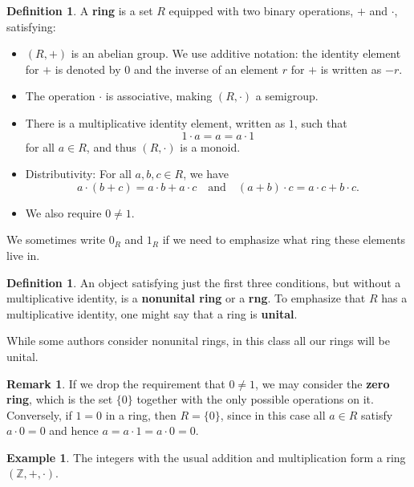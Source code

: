 \documentclass[12pt]{report}
\numberwithin{equation}{section}
\numberwithin{theorem}{chapter}
\theoremstyle{definition}
\newtheorem{definition}[theorem]{Definition}
\newtheorem{example}[theorem]{Example}
\newtheorem*{basic properties}{Basic Properties}
\newtheorem*{Important Remark}{Important Remark}
\newtheorem{remark}[theorem]{Remark}
\newcommand{\df}[1]{{\bf #1}\index{#1}}
\begin{document}
\begin{definition} 
A \df{ring} is a set $R$ equipped with two binary operations, $+$ and $\cdot$, satisfying:
\begin{itemize}[itemsep=-0.2em]
\item $(R,+)$ is an abelian group. We use additive notation: the identity element for $+$ is denoted by $0$ and the inverse of an element $r$ for $+$ is written as $-r$. 
\item The operation $\cdot$ is associative, making $(R,\cdot)$ a semigroup.
\item There is a multiplicative identity element, written as $1$, such that 
$$1 \cdot a = a = a \cdot 1$$ 
for all $a \in R$, and thus $(R, \cdot)$ is a monoid.

\item Distributivity: For all $a,b,c \in R$, we have 
$$a \cdot (b + c) = a \cdot b + a \cdot c \quad \text{and} \quad (a + b) \cdot c = a \cdot c + b \cdot c.$$
\item We also require $0 \neq 1$.
\end{itemize}
\end{definition}

We sometimes write $0_R$ and $1_R$ if we need to emphasize what ring these elements live in.%

\begin{definition}
An object satisfying just the first three conditions, but without a multiplicative identity, is a {\bf nonunital ring}  or a {\bf rng}. To emphasize that $R$ has a multiplicative identity, one might say that a ring is {\bf unital}. 
\end{definition}
 

While some authors consider nonunital rings, in this class all our rings will be unital.

\begin{remark}
If we drop the requirement that $0 \neq 1$, we may consider the \df{zero ring}, which is the set $\{ 0 \}$ together with the only possible operations on it.
	Conversely, if $1 = 0$ in a ring, then $R = \{0\}$, since in this case all $a \in R$ satisfy $a \cdot 0 = 0$ and hence $a = a \cdot 1 = a \cdot 0 = 0$.
\end{remark}


\begin{example}
	The integers with the usual addition and multiplication form a ring $(\mathbb{Z},+,\cdot)$.
\end{example}
 
\end{document}
